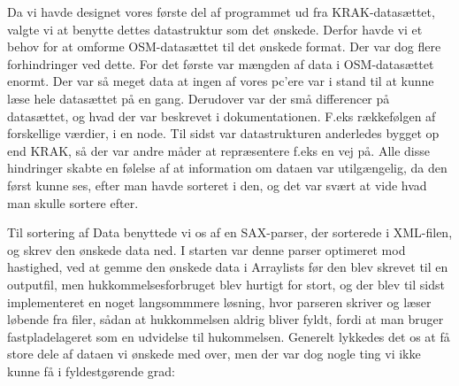 Da vi havde designet vores første del af programmet ud fra KRAK-datasættet, valgte vi at benytte dettes datastruktur som det ønskede. Derfor havde vi et behov for at omforme OSM-datasættet til det ønskede format. Der var dog flere forhindringer ved dette. For det første var mængden af data i OSM-datasættet enormt. Der var så meget data at ingen af vores pc'ere var i stand til at kunne læse hele datasættet på en gang. Derudover var der  små differencer på datasættet, og hvad der var beskrevet i dokumentationen. F.eks rækkefølgen af forskellige værdier, i en node. Til sidst var datastrukturen anderledes bygget op end KRAK, så der var andre måder at repræsentere f.eks en vej på. Alle disse hindringer skabte en følelse af at information om dataen var utilgængelig, da den først kunne ses, efter man havde sorteret i den, og det var svært at vide hvad man skulle sortere efter.

Til sortering af Data benyttede vi os af en SAX-parser, der sorterede i XML-filen, og skrev den ønskede data ned. I starten var denne parser optimeret mod hastighed, ved at gemme den ønskede data i Arraylists før den blev skrevet til en outputfil, men hukkommelsesforbruget blev hurtigt for stort, og der blev til sidst implementeret en noget langsommmere løsning, hvor parseren skriver og læser løbende fra filer, sådan at hukkommelsen aldrig bliver fyldt, fordi at man bruger fastpladelageret som en udvidelse til hukommelsen. Generelt lykkedes det os at få store dele af dataen vi ønskede med over, men der var dog nogle ting vi ikke kunne få i fyldestgørende grad:

